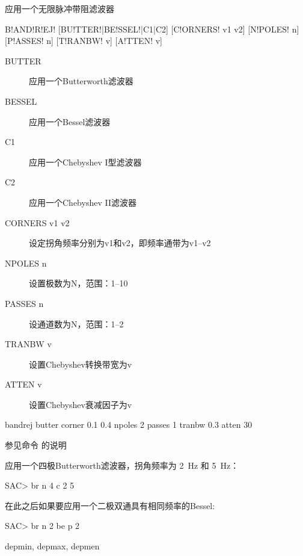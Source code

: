 \label{cmd:bandrej}

应用一个无限脉冲带阻滤波器

\begin{SACSTX}
B!AND!R!EJ! [BU!TTER!|BE!SSEL!|C1|C2] [C!ORNERS! v1 v2] [N!POLES! n] [P!ASSES! n]
    [T!RANBW! v] [A!TTEN! v]
\end{SACSTX}

\begin{description}
\item [BUTTER] 应用一个Butterworth滤波器
\item [BESSEL] 应用一个Bessel滤波器
\item [C1] 应用一个Chebyshev I型滤波器
\item [C2] 应用一个Chebyshev II滤波器
\item [CORNERS v1 v2] 设定拐角频率分别为v1和v2，即频率通带为v1--v2
\item [NPOLES n] 设置极数为N，范围：1--10
\item [PASSES n] 设通道数为N，范围：1--2
\item [TRANBW v] 设置Chebyshev转换带宽为v
\item [ATTEN v] 设置Chebyshev衰减因子为v
\end{description}

\begin{SACDFT}
bandrej butter corner 0.1 0.4 npoles 2 passes 1 tranbw 0.3 atten 30
\end{SACDFT}

参见命令  的说明

应用一个四极Butterworth滤波器，拐角频率为 \SI{2}{\Hz} 和 \SI{5}{\Hz}：
\begin{SACCode}
SAC> br n 4 c 2 5
\end{SACCode}

在此之后如果要应用一个二极双通具有相同频率的Bessel:
\begin{SACCode}
SAC> br n 2 be p 2
\end{SACCode}

depmin, depmax, depmen

